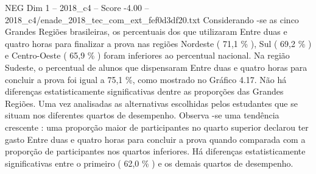 \begin{textsample}{NEG Dim 1 – 2018\_c4 – Score -4.00 – 2018\_c4/enade\_2018\_tec\_com\_ext\_fef0d3df20.txt}
Considerando -se as cinco Grandes Regiões brasileiras, os percentuais dos que utilizaram Entre duas e quatro horas para finalizar a prova nas regiões Nordeste ( 71,1 \% ), Sul ( 69,2 \% ) e Centro-Oeste ( 65,9 \% ) foram inferiores ao percentual nacional.
Na região Sudeste, o percentual de alunos que dispensaram Entre duas e quatro horas para concluir a prova foi igual a 75,1 \%, como mostrado no Gráfico 4.17.
Não há diferenças estatisticamente significativas dentre as proporções das Grandes Regiões.
Uma vez analisadas as alternativas escolhidas pelos estudantes que se situam nos diferentes quartos de desempenho.
Observa -se uma tendência crescente : uma proporção maior de participantes no quarto superior declarou ter gasto Entre duas e quatro horas para concluir a prova quando comparada com a proporção de participantes nos quartos inferiores.
Há diferenças estatisticamente significativas entre o primeiro ( 62,0 \% ) e os demais quartos de desempenho.

\end{textsample}
